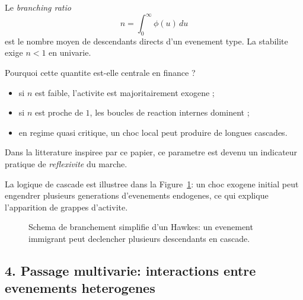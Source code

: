 \documentclass[11pt,a4paper]{article}
\begin{document}
Le \emph{branching ratio}
\[
n=\int_0^\infty \phi(u)\,du
\]
est le nombre moyen de descendants directs d'un evenement type. La stabilite exige $n<1$ en univarie.

Pourquoi cette quantite est-elle centrale en finance ?
\begin{itemize}[leftmargin=1.2cm]
    \item si $n$ est faible, l'activite est majoritairement exogene ;
    \item si $n$ est proche de $1$, les boucles de reaction internes dominent ;
    \item en regime quasi critique, un choc local peut produire de longues cascades.
\end{itemize}

Dans la litterature inspiree par ce papier, ce parametre est devenu un indicateur pratique de \emph{reflexivite} du marche.

La logique de cascade est illustree dans la Figure~\ref{fig:branching_schema}: un choc exogene initial peut engendrer plusieurs generations d'evenements endogenes, ce qui explique l'apparition de grappes d'activite.

\begin{figure}[H]
\centering
{}
\caption{Schema de branchement simplifie d'un Hawkes: un evenement immigrant peut declencher plusieurs descendants en cascade.}
\label{fig:branching_schema}
\end{figure}

\subsection*{4. Passage multivarie: interactions entre evenements heterogenes}
\end{document}
